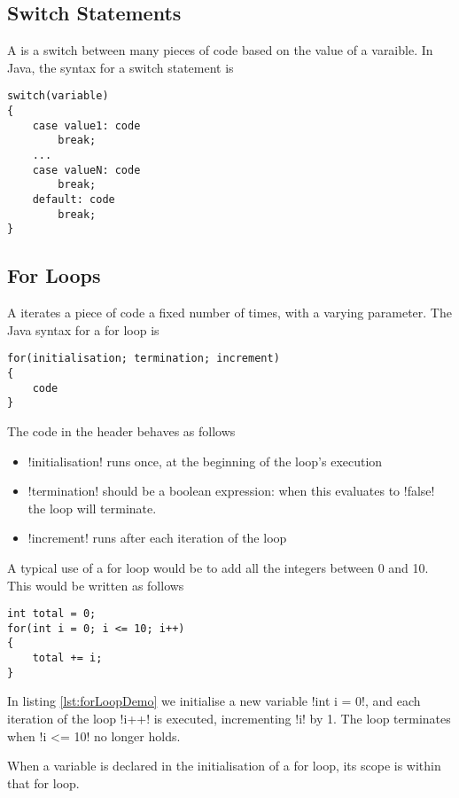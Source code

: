 \documentclass[11pt]{article}
\begin{document}
\subsection{Switch Statements}
A  is a switch between many pieces of code based on the value of a varaible. In Java, the syntax for a switch statement is
\vspace{-20pt}
\begin{lstlisting}[style=basic]
switch(variable)
{
    case value1: code
        break;
    ...
    case valueN: code
        break;
    default: code
        break;
}
\end{lstlisting}
\subsection{For Loops}
A  iterates a piece of code a fixed number of times, with a varying parameter. The Java syntax for a for loop is
\vspace{-20pt}
\begin{lstlisting}[style=basic]
for(initialisation; termination; increment)
{
    code
}
\end{lstlisting}
The code in the header behaves as follows
\begin{itemize}
    \item \inline!initialisation! runs once, at the beginning of the loop's execution
    \item \inline!termination! should be a boolean expression: when this evaluates to \inline!false! the loop will terminate.
    \item \inline!increment! runs after each iteration of the loop
\end{itemize}
\begin{eg} A typical use of a for loop would be to add all the integers between 0 and 10. This would be written as follows
\begin{lstlisting}[caption=A typical use of a for loop, label=lst:forLoopDemo]
int total = 0;
for(int i = 0; i <= 10; i++)
{
    total += i;
}
\end{lstlisting}
In listing \ref{lst:forLoopDemo} we initialise a new variable \inline!int i = 0!, and each iteration of the loop \inline!i++! is executed, incrementing \inline!i! by 1. The loop terminates when \inline!i <= 10! no longer holds.
\end{eg}
\begin{note}
    When a variable is declared in the initialisation of a for loop, its scope is within that for loop.
\end{note}
\end{document}
